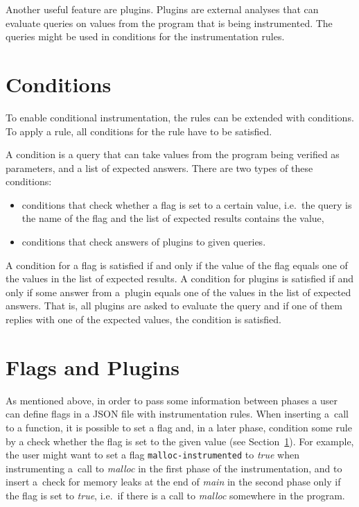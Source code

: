 Another useful feature are plugins. Plugins are external analyses that can
evaluate queries on values from the program that is being instrumented. The
queries might be used in conditions for the instrumentation rules.

\section{Conditions}\label{sec:conditions}

To enable conditional instrumentation, the rules can be extended with
conditions. To apply a rule, all conditions for the rule have to be satisfied.

A condition is a query that can take values from the program being verified as
parameters, and a list of expected answers. There are two types of these
conditions:
\begin{itemize}
 \item conditions that check whether a flag is set to a certain value, i.e.~the
 query is the name of the flag and the list of expected results contains the value,
 \item conditions that check answers of plugins to given queries.
\end{itemize}

A condition for a flag is satisfied if and only if the value of the flag equals
one of the values in the list of expected results. A condition for plugins is
satisfied if and only if some answer from a~plugin equals one of the values in
the list of expected answers. That is, all plugins are asked to evaluate the
query and if one of them replies with one of the expected values, the condition
is satisfied.

\section{Flags and Plugins}

As mentioned above, in order to pass some information between phases a user can
define flags in a JSON file with instrumentation rules. When inserting a~call
to a function, it is possible to set a flag and, in a later phase, condition
some rule by a check whether the flag is set to the given value (see
Section~\ref{sec:conditions}).  For example, the user might want to set a flag
\texttt{malloc-instrumented} to \emph{true} when instrumenting a~call to
\emph{malloc} in the first phase of the instrumentation, and to insert a~check
for memory leaks at the end of \emph{main} in the second phase only if the flag
    is set to \emph{true}, i.e.~if there is a call to \emph{malloc} somewhere
    in the program.

